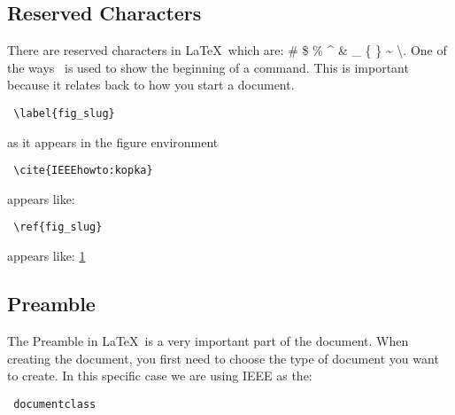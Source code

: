 \documentclass[12pt,journal,compsoc]{IEEEtran}
\begin{document}

\begin{figure}[h] 	%
\centering
\label{fig_slug}
\end{figure}


\subsection{Reserved Characters}
There are reserved characters in \LaTeX\ which are:
\# \$ \% \^{} \& \_ \{ \} \~{} \textbackslash{}.
One of the ways \ is used to show the beginning of a command. This is important because it relates back to how you start a document.
\begin{verbatim} \label{fig_slug} \end{verbatim} as it appears in the figure environment\\
\begin{verbatim} \cite{IEEEhowto:kopka} \end{verbatim} appears like: \cite{IEEEhowto:kopka}\\
\begin{verbatim} \ref{fig_slug} \end{verbatim} appears like: \ref{fig_slug}\\


\subsection{Preamble}
The Preamble in \LaTeX\ is a very important part of the document. When creating the document, you first need to choose the type of document you want to create. In this specific case we are using IEEE as the: \begin {verbatim} documentclass \end{verbatim}
\end{document}
